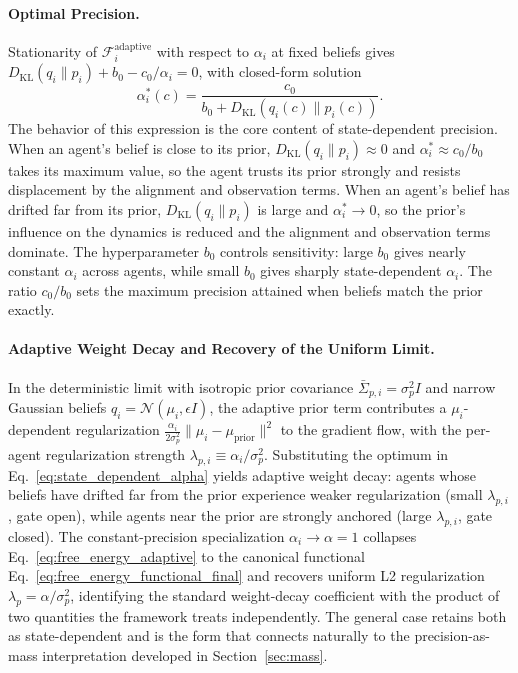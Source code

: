 \documentclass[11pt]{article}
\begin{document}
\paragraph{Optimal Precision.}
Stationarity of $\mathcal{F}_i^{\mathrm{adaptive}}$ with respect to $\alpha_i$ at fixed beliefs gives $D_{\mathrm{KL}}(q_i\|p_i) + b_0 - c_0/\alpha_i = 0$, with closed-form solution
\begin{equation}
\boxed{
\alpha_i^*(c) = \frac{c_0}{b_0 + D_{\mathrm{KL}}(q_i(c)\|p_i(c))}.
}
\label{eq:state_dependent_alpha}
\end{equation}
The behavior of this expression is the core content of state-dependent precision. When an agent's belief is close to its prior, $D_{\mathrm{KL}}(q_i\|p_i) \approx 0$ and $\alpha_i^* \approx c_0/b_0$ takes its maximum value, so the agent trusts its prior strongly and resists displacement by the alignment and observation terms. When an agent's belief has drifted far from its prior, $D_{\mathrm{KL}}(q_i\|p_i)$ is large and $\alpha_i^* \to 0$, so the prior's influence on the dynamics is reduced and the alignment and observation terms dominate. The hyperparameter $b_0$ controls sensitivity: large $b_0$ gives nearly constant $\alpha_i$ across agents, while small $b_0$ gives sharply state-dependent $\alpha_i$. The ratio $c_0/b_0$ sets the maximum precision attained when beliefs match the prior exactly.

\paragraph{Adaptive Weight Decay and Recovery of the Uniform Limit.}
In the deterministic limit with isotropic prior covariance $\bar\Sigma_{p,i} = \sigma_p^2 I$ and narrow Gaussian beliefs $q_i = \mathcal{N}(\mu_i, \epsilon I)$, the adaptive prior term contributes a $\mu_i$-dependent regularization $\frac{\alpha_i}{2\sigma_p^2}\|\mu_i - \mu_{\mathrm{prior}}\|^2$ to the gradient flow, with the per-agent regularization strength $\lambda_{p,i} \equiv \alpha_i/\sigma_p^2$. Substituting the optimum in Eq.~\eqref{eq:state_dependent_alpha} yields adaptive weight decay: agents whose beliefs have drifted far from the prior experience weaker regularization (small $\lambda_{p,i}$, gate open), while agents near the prior are strongly anchored (large $\lambda_{p,i}$, gate closed). The constant-precision specialization $\alpha_i \to \alpha = 1$ collapses Eq.~\eqref{eq:free_energy_adaptive} to the canonical functional Eq.~\eqref{eq:free_energy_functional_final} and recovers uniform L2 regularization $\lambda_p = \alpha/\sigma_p^2$, identifying the standard weight-decay coefficient with the product of two quantities the framework treats independently. The general case retains both as state-dependent and is the form that connects naturally to the precision-as-mass interpretation developed in Section~\ref{sec:mass}.
\end{document}
